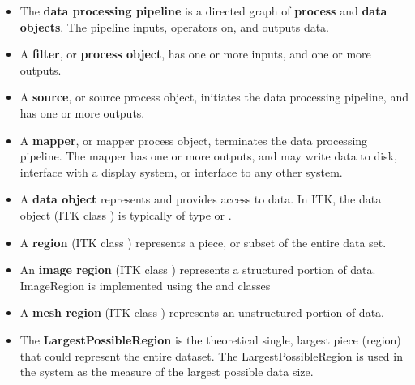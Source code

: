 \begin{itemize}
        \item The \textbf{data processing pipeline} is a directed graph of
        \textbf{process} and \textbf{data objects}. The pipeline inputs,
        operators on, and outputs data.

        \item A \textbf{filter}, or \textbf{process object}, has one or more
        inputs, and one or more outputs.

        \item A \textbf{source}, or source process object, initiates the data
        processing pipeline, and has one or more outputs.

        \item A \textbf{mapper}, or mapper process object, terminates the
        data processing pipeline. The mapper has one or more outputs, and may
        write data to disk, interface with a display system, or interface to
        any other system.

        \item A \textbf{data object} represents and provides access to
        data. In ITK, the data object (ITK class ) is 
        typically of type  or .

        \item A \textbf{region} (ITK class ) represents a 
        piece, or subset of the entire data set.

        \item An \textbf{image region} (ITK class )
        represents a structured portion of data. ImageRegion is implemented
        using the  and  classes

        \item A \textbf{mesh region} (ITK class ) 
        represents an unstructured portion of data.

        \item The \textbf{LargestPossibleRegion} is the theoretical single,
        largest piece (region) that could represent the entire dataset. The
        LargestPossibleRegion is used in the system as the measure of the
        largest possible data size.


\end{itemize}
